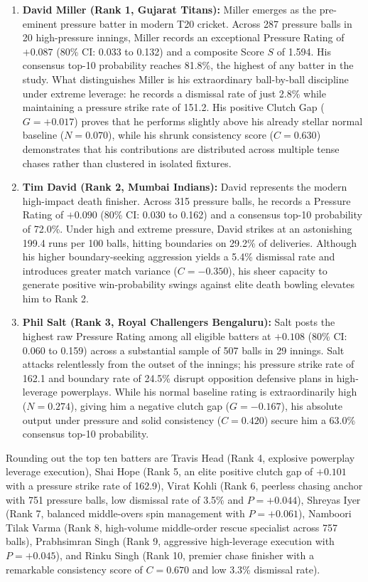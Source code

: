 \documentclass[11pt,a4paper]{article}
\begin{document}
\begin{enumerate}
    \item \textbf{David Miller (Rank 1, Gujarat Titans):} Miller emerges as the pre-eminent pressure batter in modern T20 cricket. Across 287 pressure balls in 20 high-pressure innings, Miller records an exceptional Pressure Rating of $+0.087$ (80\% CI: 0.033 to 0.132) and a composite Score $S$ of 1.594. His consensus top-10 probability reaches 81.8\%, the highest of any batter in the study. What distinguishes Miller is his extraordinary ball-by-ball discipline under extreme leverage: he records a dismissal rate of just 2.8\% while maintaining a pressure strike rate of 151.2. His positive Clutch Gap ($G = +0.017$) proves that he performs slightly above his already stellar normal baseline ($N = 0.070$), while his shrunk consistency score ($C = 0.630$) demonstrates that his contributions are distributed across multiple tense chases rather than clustered in isolated fixtures.
    \item \textbf{Tim David (Rank 2, Mumbai Indians):} David represents the modern high-impact death finisher. Across 315 pressure balls, he records a Pressure Rating of $+0.090$ (80\% CI: 0.030 to 0.162) and a consensus top-10 probability of 72.0\%. Under high and extreme pressure, David strikes at an astonishing 199.4 runs per 100 balls, hitting boundaries on 29.2\% of deliveries. Although his higher boundary-seeking aggression yields a 5.4\% dismissal rate and introduces greater match variance ($C = -0.350$), his sheer capacity to generate positive win-probability swings against elite death bowling elevates him to Rank 2.
    \item \textbf{Phil Salt (Rank 3, Royal Challengers Bengaluru):} Salt posts the highest raw Pressure Rating among all eligible batters at $+0.108$ (80\% CI: 0.060 to 0.159) across a substantial sample of 507 balls in 29 innings. Salt attacks relentlessly from the outset of the innings; his pressure strike rate of 162.1 and boundary rate of 24.5\% disrupt opposition defensive plans in high-leverage powerplays. While his normal baseline rating is extraordinarily high ($N = 0.274$), giving him a negative clutch gap ($G = -0.167$), his absolute output under pressure and solid consistency ($C = 0.420$) secure him a 63.0\% consensus top-10 probability.
\end{enumerate}

Rounding out the top ten batters are Travis Head (Rank 4, explosive powerplay leverage execution), Shai Hope (Rank 5, an elite positive clutch gap of $+0.101$ with a pressure strike rate of 162.9), Virat Kohli (Rank 6, peerless chasing anchor with 751 pressure balls, low dismissal rate of 3.5\% and $P = +0.044$), Shreyas Iyer (Rank 7, balanced middle-overs spin management with $P = +0.061$), Namboori Tilak Varma (Rank 8, high-volume middle-order rescue specialist across 757 balls), Prabhsimran Singh (Rank 9, aggressive high-leverage execution with $P = +0.045$), and Rinku Singh (Rank 10, premier chase finisher with a remarkable consistency score of $C = 0.670$ and low 3.3\% dismissal rate).
\end{document}
